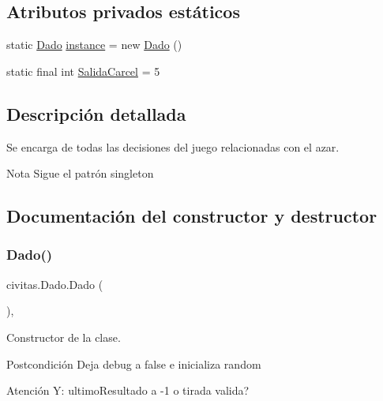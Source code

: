 \subsection*{Atributos privados estáticos}
\begin{DoxyCompactItemize}
\item 
static \hyperlink{classcivitas_1_1Dado}{Dado} \hyperlink{classcivitas_1_1Dado_a579634749a6f9f18f964cc04e181b002}{instance} = new \hyperlink{classcivitas_1_1Dado}{Dado} ()
\item 
static final int \hyperlink{classcivitas_1_1Dado_a534213cedc8582a460c56c5ef47cc4b1}{Salida\+Carcel} = 5
\end{DoxyCompactItemize}


\subsection{Descripción detallada}
Se encarga de todas las decisiones del juego relacionadas con el azar. 

\begin{DoxyNote}{Nota}
Sigue el patrón singleton 
\end{DoxyNote}


\subsection{Documentación del constructor y destructor}
\mbox{\label{classcivitas_1_1Dado_aab64a2f030d463362b5ec30c8a9a21c8}} 
\subsubsection{\texorpdfstring{Dado()}{Dado()}}
{\footnotesize\ttfamily civitas.\+Dado.\+Dado (\begin{DoxyParamCaption}{ }\end{DoxyParamCaption})\hspace{0.3cm}{\ttfamily [inline]}, {\ttfamily [package]}}

Constructor de la clase. \begin{DoxyPostcond}{Postcondición}
Deja debug a false e inicializa random 
\end{DoxyPostcond}
\begin{DoxyWarning}{Atención}
Y\+: ultimo\+Resultado a -\/1 o tirada valida? 
\end{DoxyWarning}


